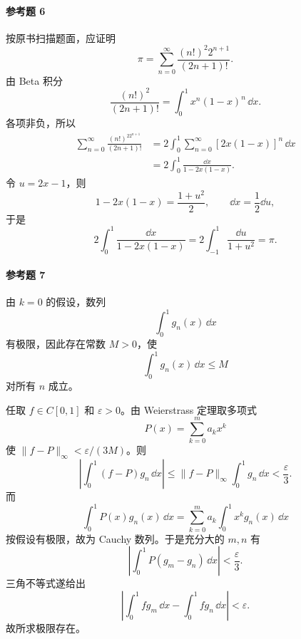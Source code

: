 \paragraph{参考题 6}
\begin{xsolution}
按原书扫描题面，应证明
\[
  \pi=\sum_{n=0}^{\infty}
  \frac{(n!)^2 2^{n+1}}{(2n+1)!}.
\]
由 Beta 积分
\[
  \frac{(n!)^2}{(2n+1)!}
  =\int_0^1x^n(1-x)^n\,\dd x.
\]
各项非负，所以
\[
\begin{aligned}
  \sum_{n=0}^{\infty}\frac{(n!)^22^{n+1}}{(2n+1)!}
  &=2\int_0^1\sum_{n=0}^{\infty}[2x(1-x)]^n\,\dd x\\
  &=2\int_0^1\frac{\dd x}{1-2x(1-x)}.
\end{aligned}
\]
令 $u=2x-1$，则
\[
  1-2x(1-x)=\frac{1+u^2}{2},\qquad \dd x=\frac12\dd u,
\]
于是
\[
  2\int_0^1\frac{\dd x}{1-2x(1-x)}
  =2\int_{-1}^1\frac{\dd u}{1+u^2}=\pi.
\]
\end{xsolution}

\paragraph{参考题 7}
\begin{xsolution}
由 $k=0$ 的假设，数列
\[
  \int_0^1g_n(x)\,\dd x
\]
有极限，因此存在常数 $M>0$，使
\[
  \int_0^1g_n(x)\,\dd x\leqslant M
\]
对所有 $n$ 成立。

任取 $f\in C[0,1]$ 和 $\varepsilon>0$。由 Weierstrass 定理取多项式
\[
  P(x)=\sum_{k=0}^ma_kx^k
\]
使 $\|f-P\|_\infty<\varepsilon/(3M)$。则
\[
  \left|\int_0^1(f-P)g_n\,\dd x\right|
  \leqslant\|f-P\|_\infty\int_0^1g_n\,\dd x<\frac\varepsilon3.
\]
而
\[
  \int_0^1P(x)g_n(x)\,\dd x
  =\sum_{k=0}^ma_k\int_0^1x^kg_n(x)\,\dd x
\]
按假设有极限，故为 Cauchy 数列。于是充分大的 $m,n$ 有
\[
  \left|\int_0^1P(g_m-g_n)\,\dd x\right|<\frac\varepsilon3.
\]
三角不等式遂给出
\[
  \left|\int_0^1fg_m\,\dd x-\int_0^1fg_n\,\dd x\right|<\varepsilon.
\]
故所求极限存在。
\end{xsolution}

